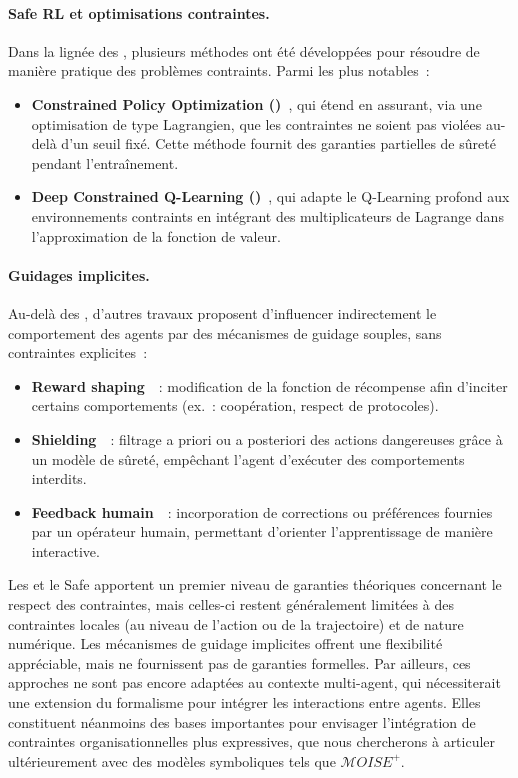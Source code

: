 \paragraph{Safe RL et optimisations contraintes.}
Dans la lignée des , plusieurs méthodes ont été développées pour résoudre de manière pratique
des problèmes contraints. Parmi les plus notables~:
\begin{itemize}
  \item \textbf{Constrained Policy Optimization ()}~\cite{achiam2017constrained},
        qui étend  en assurant,
        via une optimisation de type Lagrangien, que les contraintes ne soient
        pas violées au-delà d'un seuil fixé. Cette méthode fournit des garanties
        partielles de sûreté pendant l'entraînement.
  \item \textbf{Deep Constrained Q-Learning ()}~\cite{kalweit2020deep},
        qui adapte le Q-Learning profond aux environnements contraints
        en intégrant des multiplicateurs de Lagrange dans l'approximation
        de la fonction de valeur.
\end{itemize}

\paragraph{Guidages implicites.}
Au-delà des , d'autres travaux proposent d'influencer indirectement
le comportement des agents par des mécanismes de guidage souples,
sans contraintes explicites~:
\begin{itemize}
  \item \textbf{Reward shaping}~\cite{ng1999policy}~: modification de la fonction
        de récompense afin d'inciter certains comportements (ex.~: coopération,
        respect de protocoles).
  \item \textbf{Shielding}~\cite{amodei2016concrete}~: filtrage a priori ou a posteriori
        des actions dangereuses grâce à un modèle de sûreté,
        empêchant l'agent d'exécuter des comportements interdits.
  \item \textbf{Feedback humain}~\cite{warnell2018deep}~: incorporation de corrections
        ou préférences fournies par un opérateur humain,
        permettant d'orienter l'apprentissage de manière interactive.
\end{itemize}

Les  et le Safe  apportent un premier niveau de garanties théoriques concernant le respect des contraintes, mais celles-ci restent généralement limitées à des contraintes locales (au niveau de l'action ou de la trajectoire) et de nature numérique. Les mécanismes de guidage implicites offrent une flexibilité appréciable, mais ne fournissent pas de garanties formelles. Par ailleurs, ces approches ne sont pas encore adaptées au contexte multi-agent, qui nécessiterait une extension du formalisme pour intégrer les interactions entre agents. Elles constituent néanmoins des bases importantes pour envisager l'intégration de contraintes organisationnelles plus expressives, que nous chercherons à articuler ultérieurement avec des modèles symboliques tels que $\mathcal{M}OISE^+$.

